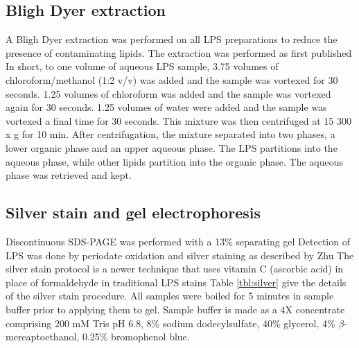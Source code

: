 	\subsection{Bligh Dyer extraction} %
	\label{sub:bligh_dyer_extraction}
  A Bligh Dyer extraction was performed on all \ac{LPS} preparations to reduce the presence of
  contaminating lipids. The extraction was performed as first published In
  short, to one volume of aqueous \ac{LPS} sample, 3.75 volumes of chloroform/methanol (1:2 v/v) was
  added and the sample was vortexed for 30 seconds. 1.25 volumes of chloroform was added and the
  sample was vortexed again for 30 seconds. 1.25 volumes of water were added and the sample was
  vortexed a final time for 30 seconds. This mixture was then centrifuged at 15 300 x g for 10
  min. After centrifugation, the mixture separated into two phases, a lower organic phase and an
  upper aqueous phase. The \ac{LPS} partitions into the aqueous phase, while other lipids partition
  into the organic phase. The aqueous phase was retrieved and kept.

	\subsection{Silver stain and gel electrophoresis} %
	\label{sub:gel_electrophoresis}

  Discontinuous \ac{SDS-PAGE} was performed with a 13\% separating gel Detection
  of \ac{LPS} was done by periodate oxidation and silver staining as described by Zhu
  \etal\! The silver stain protocol is a newer technique that uses
  vitamin C (ascorbic acid) in place of formaldehyde in traditional \ac{LPS}
  stains Table \ref{tbl:silver} give the details of the silver stain
  procedure.%
All samples were boiled for 5 minutes in sample buffer prior to applying them to gel. Sample buffer is made as a 4X concentrate comprising 200 mM Tris pH 6.8, 8\% sodium dodecylsulfate, 40\% glycerol, 4\% $\beta$-mercaptoethanol, 0.25\% bromophenol blue.

